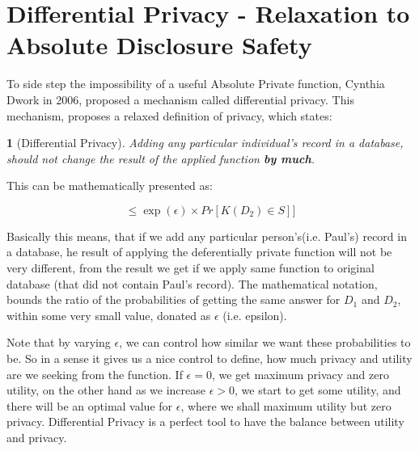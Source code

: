 \documentclass[12pt]{report}
\theoremstyle{named}
\newtheorem*{namedtheorem}{}
\begin{document}
\section{Differential Privacy - Relaxation to Absolute Disclosure Safety}
To side step the impossibility of a useful Absolute Private function,  Cynthia Dwork in 2006, proposed a mechanism called differential privacy.  This mechanism, proposes a relaxed definition of privacy, which states:

\begin{namedtheorem}[Differential Privacy\cite{Dwork:2006:DP:2097282.2097284}]
Adding any particular individual's record in a database, should not change the result of the applied function \textbf{by much}.
\end{namedtheorem}

This can be mathematically presented as:

\begin{equation}
[Pr[\mathit{K}(D_{1})\in S] \leq \exp (\epsilon ) \times Pr[\mathit{K}(D_{2})\in S]] \end{equation}


Basically this means, that if we add any particular person's(i.e. Paul's) record in a database, he result of applying the deferentially private function will not be very different, from the result we get if we apply same function to original database (that did not contain Paul's record). The mathematical notation, bounds the ratio of the probabilities of getting the same answer for $D_{1}$ and $D_2$, within some very small value, donated as $\epsilon$ (i.e. epsilon).

Note that by varying $\epsilon$, we can control how similar we want these probabilities to be. So in a sense it gives us a nice control to define, how much privacy and utility are we seeking from the function. If $\epsilon = 0$, we get maximum privacy and zero utility, on the other hand as we increase $\epsilon > 0$, we start to get some utility, and there will be an optimal value for $\epsilon$, where we shall maximum utility but zero privacy. Differential Privacy is a perfect tool to have the balance between utility and privacy.
\end{document}

